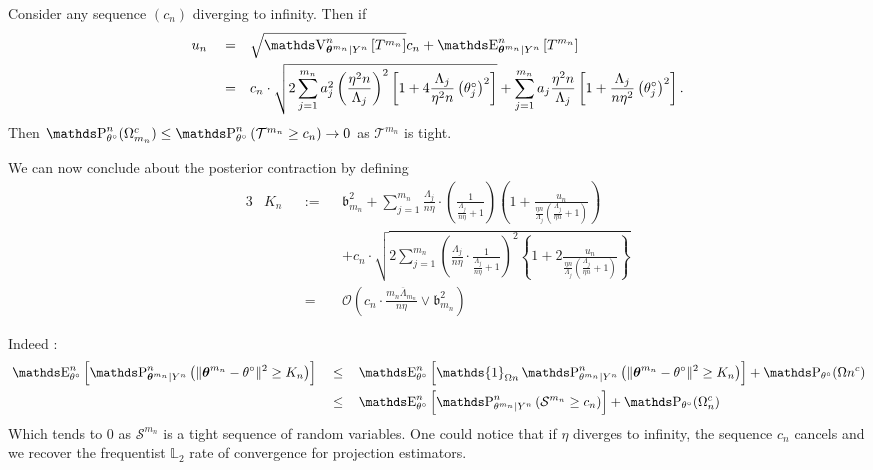 \begin{pro}
{Consider any sequence $(c_{n})$ diverging to infinity.
Then if
\begin{alignat*}{3}
&u_{n} &&=&& \sqrt{\V_{\boldsymbol{\theta}^{m_{n}} \vert Y^{n}}^{n}\left[T^{m_{n}}\right]} c_{n} + \E_{\boldsymbol{\theta}^{m_{n}} \vert Y^{n}}^{n}\left[T^{m_{n}}\right]\\
& &&=&& c_{n} \cdot \sqrt{2 \sum\limits_{j = 1}^{m_{n}} a_{j}^{2} \left(\frac{\eta^{2} n}{\Lambda_{j}}\right)^{2} \left[1 + 4 \frac{\Lambda_{j}}{\eta^{2} n} \left(\theta^{\circ}_{j} \right)^{2}\right]} + \sum\limits_{j = 1}^{m_{n}} a_{j} \frac{\eta^{2} n}{\Lambda_{j}} \left[1 + \frac{\Lambda_{j}}{n \eta^{2}} \left(\theta^{\circ}_{j} \right)^{2}\right].
\end{alignat*}
Then $\P_{\theta^{\circ}}^{n}(\Omega_{m_{n}}^{c}) \leq  \P_{\theta^{\circ}}^{n}\left(\mathcal{T}^{m_{n}} \geq c_{n}\right) \rightarrow 0$ as $\mathcal{T}^{m_{n}}$ is tight.
}

\medskip

We can now conclude about the posterior contraction by defining
\begin{alignat*}{3}
&K_{n} &&:=&& \mathfrak{b}_{m_{n}}^{2} +  \sum\limits_{j = 1}^{m_{n}} \frac{\Lambda_{j}}{n \eta}\cdot \left(\frac{1}{\frac{\Lambda_{j}}{n \eta} + 1}\right)\left(1 + \frac{u_{n}}{\frac{\eta n}{\Lambda_{j}}\left(\frac{\Lambda_{j}}{\eta n} + 1\right)}\right)\\
& && && + c_{n} \cdot \sqrt{2 \sum\limits_{j = 1}^{m_{n}} \left(\frac{\Lambda_{j}}{n \eta}\cdot \frac{1}{\frac{\Lambda_{j}}{n \eta} + 1}\right)^{2}\left\{1 + 2 \frac{u_{n}}{\frac{\eta n}{\Lambda_{j}}\left(\frac{\Lambda_{j}}{\eta n} + 1\right)}\right\}}\\
& &&=&& \mathcal{O}\left(c_{n} \cdot \frac{m_{n} \overline{\Lambda}_{m_{n}}}{n \eta} \vee \mathfrak{b}_{m_{n}}^{2}\right)
\end{alignat*}


Indeed :
\begin{alignat*}{3}
&\E_{\theta^{\circ}}^{n}\left[\P_{\boldsymbol{\theta}^{m_{n}}\vert Y^{n}}^{n}\left(\Vert \boldsymbol{\theta}^{m_{n}} - \theta^{\circ} \Vert^{2} \geq K_{n}\right)\right] && \leq &&\E_{\theta^{\circ}}^{n}\left[\mathds{1}_{\Omega{n}}\P_{\theta^{m_{n}} \vert Y^{n}}^{n}\left(\Vert \boldsymbol{\theta}^{m_{n}} - \theta^{\circ} \Vert^{2} \geq K_{n}\right)\right] + \P_{\theta^{\circ}}(\Omega{n}^{c})\\
& &&\leq &&\E_{\theta^{\circ}}^{n}\left[\P_{\theta^{m_{n}}\vert Y^{n}}^{n}\left(\mathcal{S}^{m_{n}} \geq c_{n} \right)\right] + \P_{\theta^{\circ}}(\Omega_{n}^{c})\\
\end{alignat*}
Which tends to $0$ as $\mathcal{S}^{m_{n}}$ is a tight sequence of random variables.
One could notice that if $\eta$ diverges to infinity, the sequence $c_{n}$ cancels and we recover the frequentist $\mathds{L}_{2}$ rate of convergence for projection estimators.
\end{pro}

